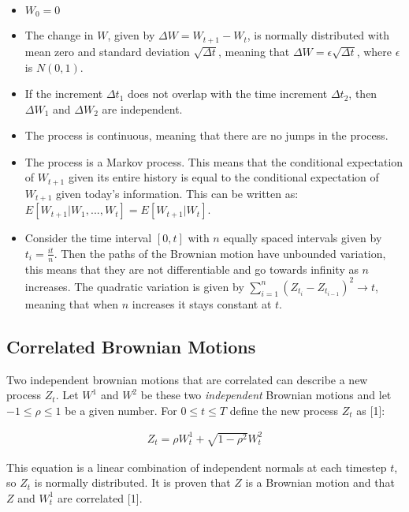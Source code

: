 \documentclass[12pt,twoside]{reedthesis}
\theoremstyle{definition}
\theoremstyle{definition}
\theoremstyle{remark}
\begin{document}
  \begin{itemize}
  \item
    \(W_{0}=0\)
  \item
    The change in \(W\), given by \(\Delta W = W_{t+1}-W_{t}\), is
    normally distributed with mean zero and standard deviation
    \(\sqrt{\Delta t}\), meaning that
    \(\Delta W = \epsilon\sqrt{\Delta t}\), where \(\epsilon\) is
    \(N(0,1)\).
  \item
    If the increment \(\Delta t_1\) does not overlap with the time
    increment \(\Delta t_2\), then \(\Delta W_1\) and \(\Delta W_2\) are
    independent.
  \item
    The process is continuous, meaning that there are no jumps in the
    process.
  \item
    The process is a Markov process. This means that the conditional
    expectation of \(W_{t+1}\) given its entire history is equal to the
    conditional expectation of \(W_{t+1}\) given today's information. This
    can be written as: \(E[W_{t+1}|W_1, ..., W_t] = E[W_{t+1}|W_t]\).
  \item
    Consider the time interval \([0,t]\) with \(n\) equally spaced
    intervals given by \(t_i = \frac{it}{n}\). Then the paths of the
    Brownian motion have unbounded variation, this means that they are not
    differentiable and go towards infinity as \(n\) increases. The
    quadratic variation is given by
    \(\sum_{i=1}^{n}{(Z_{t_i}-Z_{t_{i-1}})^2} \rightarrow t\), meaning
    that when \(n\) increases it stays constant at \(t\).
  \end{itemize}
  
  \subsection{Correlated Brownian
  Motions}\label{correlated-brownian-motions}
  
  Two independent brownian motions that are correlated can describe a new
  process \(Z_t\). Let \(W^1\) and \(W^2\) be these two \emph{independent}
  Brownian motions and let \(-1 \leq \rho \leq 1\) be a given number. For
  \(0 \leq t \leq T\) define the new process \(Z_t\) as {[}1{]}:
  
  \begin{align}
  \label{eq:corr_brow}
  Z_t = \rho W^1_t + \sqrt{1-\rho^2}W^2_t
  \end{align}
  
  \noindent
  This equation is a linear combination of independent normals at each
  timestep \(t\), so \(Z_t\) is normally distributed. It is proven that
  \(Z\) is a Brownian motion and that \(Z\) and \(W^1_t\) are correlated
  {[}1{]}.
  
\end{document}
